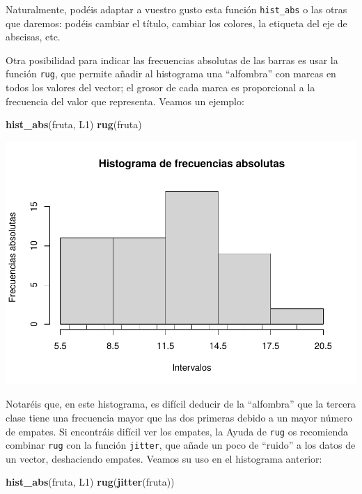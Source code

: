 \documentclass[
]{book}
\newenvironment{Shaded}{\begin{snugshade}}{\end{snugshade}}
\newcommand{\KeywordTok}[1]{\textcolor[rgb]{0.13,0.29,0.53}{\textbf{#1}}}
\newcommand{\NormalTok}[1]{#1}
\theoremstyle{definition}
\theoremstyle{definition}
\theoremstyle{definition}
\theoremstyle{remark}
\begin{document}
Naturalmente, podéis adaptar a vuestro gusto esta función \texttt{hist\_abs} o las otras que daremos: podéis cambiar el título, cambiar los colores, la etiqueta del eje de abscisas, etc.

Otra posibilidad para indicar las frecuencias absolutas de las barras es usar la función \texttt{rug}, que permite añadir al histograma una ``alfombra'' con marcas en todos los valores del vector; el grosor de cada marca es proporcional a la frecuencia del valor que representa.
Veamos un ejemplo:

\begin{Shaded}
\begin{Highlighting}[]
\KeywordTok{hist\_abs}\NormalTok{(fruta, L1)}
\KeywordTok{rug}\NormalTok{(fruta)}
\end{Highlighting}
\end{Shaded}

\begin{center}\includegraphics[width=0.9\linewidth]{13chap13_Agrupados_files/figure-latex/unnamed-chunk-73-1} \end{center}

Notaréis que, en este histograma, es difícil deducir de la ``alfombra'' que la tercera clase tiene una frecuencia mayor que las dos primeras debido a un mayor número de empates. Si encontráis difícil ver los empates, la Ayuda de \texttt{rug} os recomienda combinar \texttt{rug} con la función \texttt{jitter}, que añade un poco de ``ruido'' a los datos de un vector, deshaciendo empates. Veamos su uso en el histograma anterior:

\begin{Shaded}
\begin{Highlighting}[]
\KeywordTok{hist\_abs}\NormalTok{(fruta, L1)}
\KeywordTok{rug}\NormalTok{(}\KeywordTok{jitter}\NormalTok{(fruta))}
\end{Highlighting}
\end{Shaded}
\end{document}
